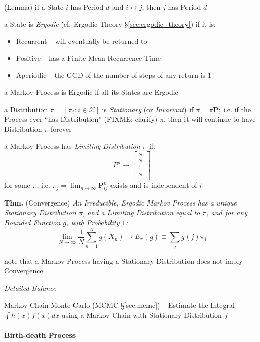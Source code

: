 (Lemma) if a State $i$ has Period $d$ and $i \leftrightarrow j$, then $j$ has
Period $d$

a State is \emph{Ergodic} (cf. Ergodic Theory \S\ref{sec:ergodic_theory}) if it
is:
\begin{itemize}
  \item Recurrent -- will eventually be returned to
  \item Positive -- has a Finite Mean Recurrence Time
  \item Aperiodic -- the GCD of the number of steps of any return is $1$
\end{itemize}
a Markov Process is Ergodic if all its States are Ergodic

a Distribution $\pi = [\pi_i : i \in \mathcal{X}]$ is \emph{Stationary} (or
\emph{Invariant}) if $\pi = \pi \mathbf{P}$; i.e. if the Process ever ``has
Distribution'' (FIXME: clarify) $\pi$, then it will continue to have
Distribution $\pi$ forever

a Markov Process has \emph{Limiting Distribution} $\pi$ if:
\[
  P^n \to \begin{bmatrix}
    \pi \\
    \pi \\
    \vdots \\
    \pi \\
  \end{bmatrix}
\]
for some $\pi$, i.e. $\pi_j = \lim_{n\to\infty} \mathbf{P}_{ij}^n$
exists and is independent of $i$

\textbf{Thm.} (Convergence) \emph{
  An Irreducible, Ergodic Markov Process has a
  unique Stationary Distribution $\pi$, and a Limiting Distribution equal to
  $\pi$, and for any Bounded Function $g$, with Probability $1$:
\[
  \lim_{N\to\infty} \frac{1}{N} \sum_{n=1}^N g(X_n) \to E_\pi(g)
    \equiv \sum_j g(j) \pi_j
\]
}

note that a Markov Process having a Stationary Distribution does not imply
Convergence

\emph{Detailed Balance}

\fist Markov Chain Monte Carlo (MCMC \S\ref{sec:mcmc}) -- Estimate the Integral
$\int h(x) f(x) dx$ using a Markov Chain with Stationary Distribution $f$



\paragraph{Birth-death Process}\label{sec:birth_death}\hfill

